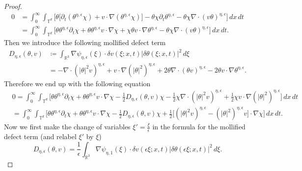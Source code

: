 \documentclass[11pt,reqno]{amsart}
\theoremstyle{definition}
\numberwithin{equation}{section}
\begin{document}
\begin{proof}
\begin{align*}
0 &= \int_0^\infty \int_{\mathbb T^d} \bigg[ \theta \big[\partial_t (\theta^{\eta,\epsilon} \chi) + v\cdot \nabla (\theta^{\eta,\epsilon} \chi) \big] - \theta \chi \partial_t \theta^{\eta,\epsilon} - \theta \chi \nabla \cdot (v \theta)^{\eta,\epsilon} \bigg] \, dx\, dt \\
&= \int_0^\infty \int_{\mathbb T^d} \bigg[ \theta \theta^{\eta,\epsilon} \partial_t \chi + \theta \theta^{\eta,\epsilon} v \cdot \nabla \chi + \chi \theta v \cdot \nabla \theta^{\eta,\epsilon} - \theta \chi \nabla \cdot (v \theta)^{\eta,\epsilon} \bigg] \, dx \, dt.
\end{align*}
Then we introduce the following mollified defect term
\begin{align*}
D_{\eta,\epsilon} (\theta,v) &\coloneqq \int_{\mathbb{R}^3} \nabla \psi_{\eta, \epsilon} (\xi) \cdot \delta v (\xi;x,t) \lvert \delta \theta (\xi; x,t) \rvert^2 \, d \xi \\
&= - \nabla \cdot (\lvert \theta \rvert^2 v)^{\eta,\epsilon} + v \cdot \nabla (\lvert \theta \rvert^2)^{\eta,\epsilon} + 2 \theta \nabla \cdot (\theta v)^{\eta,\epsilon} - 2 \theta v \cdot \nabla \theta^{\eta,\epsilon}.
\end{align*}
Therefore we end up with the following equation
\begin{align}
&0 = \int_0^\infty \int_{\mathbb T^d} \bigg[ \theta \theta^{\eta,\epsilon} \partial_t \chi + \theta \theta^{\eta,\epsilon} v \cdot \nabla \chi - \tfrac{1}{2} D_{\eta, \epsilon} (\theta,v) \chi - \tfrac{1}{2} \chi \nabla \cdot (\lvert \theta \rvert^2 v)^{\eta,\epsilon} + \tfrac{1}{2} \chi v \cdot \nabla (\lvert \theta \rvert^2)^{\eta,\epsilon} \bigg] \, dx \, dt \nonumber \\
&= \int_0^\infty \int_{\mathbb T^d} \bigg[ \theta \theta^{\eta,\epsilon} \partial_t \chi + \theta \theta^{\eta,\epsilon} v \cdot \nabla \chi - \tfrac{1}{2} D_{\eta, \epsilon} (\theta,v) \chi + \tfrac{1}{2} \big[(\lvert \theta \rvert^2 v)^{\eta,\epsilon} - (\lvert \theta \rvert^2)^{\eta,\epsilon} v \big] \cdot \nabla \chi  \bigg] \, dx \, dt. \label{mollifieddefecttermeq}
\end{align}
Now we first make the change of variables $\xi' = \frac{\xi}{\epsilon}$ in the formula for the mollified defect term (and relabel $\xi'$ by $\xi$)
\begin{equation}
D_{\eta,\epsilon} (\theta,v) = \frac{1}{\epsilon} \int_{\mathbb{R}^3} \nabla \psi_{\eta, 1} (\xi) \cdot \delta v (\epsilon \xi;x,t) \lvert \delta \theta (\epsilon \xi; x,t) \rvert^2 \, d \xi.

\end{equation}
\end{proof}
\end{document}
